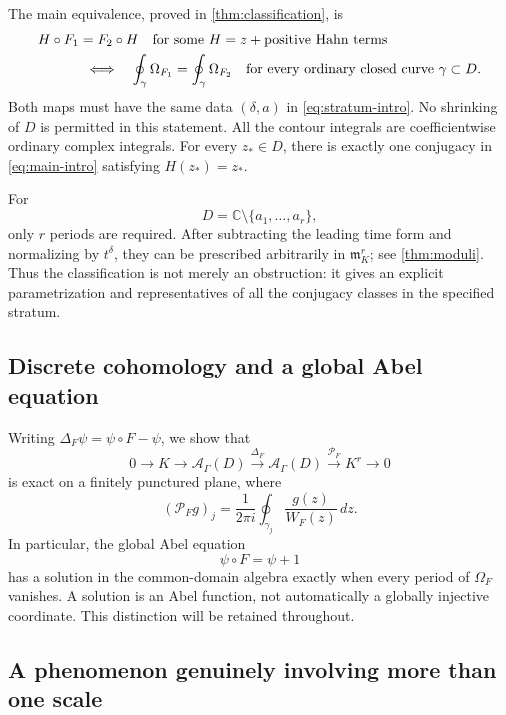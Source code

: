 \documentclass[11pt,a4paper]{article}
\numberwithin{equation}{section}
\theoremstyle{definition}
\theoremstyle{remark}
\newcommand{\C}{\mathbb C}
\newcommand{\A}{\mathcal A}
\newcommand{\mm}{\mathfrak m}
\begin{document}
The main equivalence, proved in \cref{thm:classification}, is
\begin{equation}\label{eq:main-intro}
 \begin{split}
 &H\circ F_1=F_2\circ H\quad\text{for some }H=z+\text{positive Hahn terms}
 \\
 &\hspace{12mm}\Longleftrightarrow\quad
 \oint_\gamma\Omega_{F_1}=\oint_\gamma\Omega_{F_2}
 \quad\text{for every ordinary closed curve }\gamma\subset D.
 \end{split}
\end{equation}
Both maps must have the same data $(\delta,a)$ in
\eqref{eq:stratum-intro}.  No shrinking of $D$ is permitted in this
statement.  All the contour integrals are coefficientwise ordinary complex
integrals.  For every $z_*\in D$, there is exactly one conjugacy in
\eqref{eq:main-intro} satisfying $H(z_*)=z_*$.

For
\[
 D=\C\setminus\{a_1,\ldots,a_r\},
\]
only $r$ periods are required.  After subtracting the leading time form and
normalizing by $t^\delta$, they can be prescribed arbitrarily in
$\mm_K^r$; see \cref{thm:moduli}.  Thus the classification is not merely
an obstruction: it gives an explicit parametrization and representatives
of all the conjugacy classes in the specified stratum.

\subsection{Discrete cohomology and a global Abel equation}

Writing $\Delta_F\psi=\psi\circ F-\psi$, we show that
\begin{equation}\label{eq:exact-intro}
 0\longrightarrow K\longrightarrow\A_\Gamma(D)
 \xrightarrow{\Delta_F}\A_\Gamma(D)
 \xrightarrow{\mathcal P_F}K^r\longrightarrow0
\end{equation}
is exact on a finitely punctured plane, where
\[
 (\mathcal P_Fg)_j=\frac1{2\pi i}\oint_{\gamma_j}\frac{g(z)}{W_F(z)}\,dz.
\]
In particular, the global Abel equation
\[
 \psi\circ F=\psi+1
\]
has a solution in the common-domain algebra exactly when every period of
$\Omega_F$ vanishes.  A solution is an Abel function, not automatically a
globally injective coordinate.  This distinction will be retained throughout.

\subsection{A phenomenon genuinely involving more than one scale}
\end{document}
